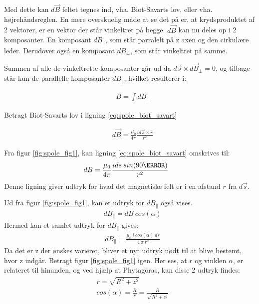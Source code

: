 Med dette kan $d\vec{B}$ feltet tegnes ind, vha. Biot-Savarts lov, eller vha. højrehåndsreglen. En mere overskuelig måde at se det på er, at krydsproduktet af 2 vektorer, er en vektor der står vinkeltret på begge. 
$d\vec{B}$ kan nu deles op i 2 komposanter. En komposant $dB_\parallel$, som står parralelt på z axen og den cirkulære leder. Derudover også en komposant $dB_\perp$, som står vinkeltret på samme.

Summen af alle de vinkeltrette komposanter går ud da $d\vec{s}\times d\vec{B}_\perp=0$, og tilbage står kun de parallelle komposanter $dB_\parallel$, hvilket resulterer i:

 \begin{align}
 &B=\int dB_\parallel \label{eq:B_field}
 \end{align}

  
  
Betragt Biot-Savarts lov i ligning \ref{eq:spole_biot_savart}

\begin{align}
&d\vec{B}=\frac{\mu_0}{4\pi} \frac{i d\vec{s} \times \hat{r}}{r^2}\label{eq:spole_biot_savart}
\end{align}

Fra figur \ref{fig:spole_fig1}, kan ligning \ref{eq:spole_biot_savart} omskrives til:
\begin{align}
&dB=\frac{\mu_0}{4\pi} \frac{i ds\: sin(90\degree)}{r^2}\label{eq:spole_biot_savart2}
\end{align}
 Denne ligning giver udtryk for hvad det magnetiske felt er i en afstand $r$ fra $d\vec{s}$.
 
Ud fra figur \ref{fig:spole_fig1}, kan et udtryk for $dB_\parallel$ også vises.
 \begin{align}
 	&dB_\parallel=dB\: cos(\alpha)
 \end{align}
Hermed kan et samlet udtryk for $dB_\parallel$ gives: 
\begin{align}
&dB_\parallel=\frac{\mu_0 \:i\: cos(\alpha)\:ds}{4\:\pi\: r^2}
\end{align}
Da det er z der ønskes varieret, bliver et nyt udtryk nødt til at blive bestemt, hvor z indgår. Betragt figur \ref{fig:spole_fig1} igen. Her ses, at $r$ og vinklen $\alpha$, er relateret til hinanden, og ved hjælp at Phytagoras, kan disse 2 udtryk findes:
\begin{align}
&r=\sqrt{R^2+z^2} \\
&cos(\alpha)=\frac{R}{r}=\frac{R}{\sqrt{R^2+z^2}}
\end{align}

